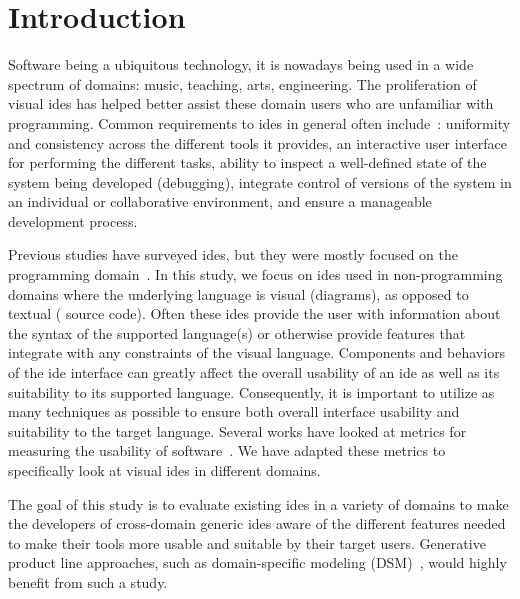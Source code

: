 \section{Introduction} \label{sec:introduction}

Software being a ubiquitous technology, it is nowadays being used in a wide
spectrum of domains: music, teaching, arts, engineering. The proliferation
of visual \acfp{ide} has helped better assist these domain users who are
unfamiliar with programming. Common requirements to \acp{ide} in general
often include~\cite{habermann1986}: uniformity and consistency across the
different tools it provides, an interactive user interface for performing
the different tasks, ability to inspect a well-defined state of the system
being developed (\eg debugging), integrate control of versions of the
system in an individual or collaborative environment, and ensure a
manageable development process.

Previous studies have surveyed \acp{ide}, but they were mostly focused on
the programming domain~\cite{hils1992, fischer1994, habermann1986}. In this
study, we focus on \acp{ide} used in non-programming domains where the
underlying language is visual (\eg diagrams), as opposed to textual (\eg
source code). Often these \acp{ide} provide the user with information about
the syntax of the supported language(s) or otherwise provide features that
integrate with any constraints of the visual language. Components and
behaviors of the \ac{ide} interface can greatly affect the overall
usability of an \ac{ide} as well as its suitability to its supported
language. Consequently, it is important to utilize as many techniques as
possible to ensure both overall interface usability and suitability to the
target language. Several works have looked at metrics for measuring the
usability of software~\cite{constantine1996,Green1996}. We have adapted
these metrics to specifically look at visual \acp{ide} in different
domains.

The goal of this study is to evaluate existing \acp{ide} in a variety of
domains to make the developers of cross-domain generic \acp{ide} aware of
the different features needed to make their tools more usable and suitable
by their target users. Generative product line approaches, such as
domain-specific modeling (DSM)~\cite{Kelly2008}, would highly benefit from
such a study.

